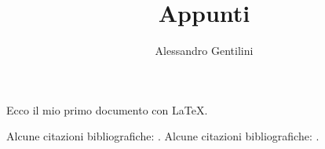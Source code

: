 \documentclass[a4paper]{article}
\begin{document}
\title{Appunti}
\author{Alessandro Gentilini}
\maketitle

Ecco il mio primo documento con \LaTeX.

Alcune citazioni bibliografiche:  \citet{bosellini_scienze_2013,hess_mcknights_2013,walker_halliday_2018,telford_applied_1990}.
Alcune citazioni bibliografiche:  \citet{bosellini_scienze_2013,baggio_note_1969}.
\citep{turcotte_geodynamics_2014,turcotte_geodynamics_2002}


\begin{small}
 
\end{small}
\end{document}

